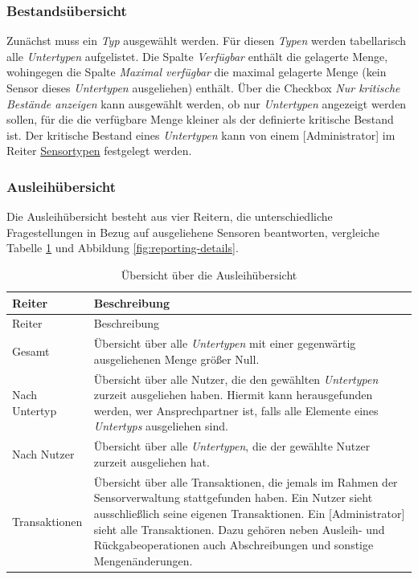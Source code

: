 \documentclass[
]{article}
\begin{document}
\hypertarget{bestandsuxfcbersicht}{%
\subsubsection{Bestandsübersicht}\label{bestandsuxfcbersicht}}

Zunächst muss ein \emph{Typ} ausgewählt werden. Für diesen \emph{Typen} werden tabellarisch alle \emph{Untertypen} aufgelistet. Die Spalte \emph{Verfügbar} enthält die gelagerte Menge, wohingegen die Spalte \emph{Maximal verfügbar} die maximal gelagerte Menge (kein Sensor dieses \emph{Untertypen} ausgeliehen) enthält. Über die Checkbox \emph{Nur kritische Bestände anzeigen} kann ausgewählt werden, ob nur \emph{Untertypen} angezeigt werden sollen, für die die verfügbare Menge kleiner als der definierte kritische Bestand ist. Der kritische Bestand eines \emph{Untertypen} kann von einem {[}Administrator{]} im Reiter \protect\hyperlink{type}{Sensortypen} festgelegt werden.

\hypertarget{ausleihuxfcbersicht}{%
\subsubsection{Ausleihübersicht}\label{ausleihuxfcbersicht}}

Die Ausleihübersicht besteht aus vier Reitern, die unterschiedliche Fragestellungen in Bezug auf ausgeliehene Sensoren beantworten, vergleiche Tabelle \ref{tab:reporting-details} und Abbildung \ref{fig:reporting-details}.

\begin{longtable}[]{@{}
  >{\raggedright\arraybackslash}p{}
  >{\raggedright\arraybackslash}p{}@{}}
\caption{\label{tab:reporting-details} Übersicht über die Ausleihübersicht}\tabularnewline
\toprule
Reiter & Beschreibung \\
\midrule
\endfirsthead
\toprule
Reiter & Beschreibung \\
\midrule
\endhead
Gesamt & Übersicht über alle \emph{Untertypen} mit einer gegenwärtig ausgeliehenen Menge größer Null. \\
Nach Untertyp & Übersicht über alle Nutzer, die den gewählten \emph{Untertypen} zurzeit ausgeliehen haben. Hiermit kann herausgefunden werden, wer Ansprechpartner ist, falls alle Elemente eines \emph{Untertyps} ausgeliehen sind. \\
Nach Nutzer & Übersicht über alle \emph{Untertypen}, die der gewählte Nutzer zurzeit ausgeliehen hat. \\
Transaktionen & Übersicht über alle Transaktionen, die jemals im Rahmen der Sensorverwaltung stattgefunden haben. Ein Nutzer sieht ausschließlich seine eigenen Transaktionen. Ein {[}Administrator{]} sieht alle Transaktionen. Dazu gehören neben Ausleih- und Rückgabeoperationen auch Abschreibungen und sonstige Mengenänderungen. \\
\bottomrule
\end{longtable}
\end{document}
